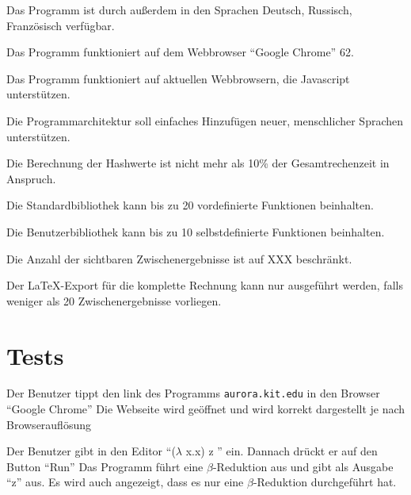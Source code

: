 \documentclass[parskip=full,11pt,twoside]{scrartcl}
\begin{document}
Das Programm ist durch außerdem in den Sprachen Deutsch, Russisch, Französisch verfügbar.

Das Programm funktioniert auf dem Webbrowser \enquote{Google Chrome} 62.

Das Programm funktioniert auf aktuellen Webbrowsern, die Javascript unterstützen.

Die Programmarchitektur soll einfaches Hinzufügen neuer, menschlicher Sprachen unterstützen.

Die Berechnung der Hashwerte ist nicht mehr als 10\% der Gesamtrechenzeit in Anspruch.

Die Standardbibliothek kann bis zu 20 vordefinierte Funktionen beinhalten.

Die Benutzerbibliothek kann bis zu 10 selbstdefinierte Funktionen beinhalten.

Die Anzahl der sichtbaren Zwischenergebnisse ist auf XXX beschränkt.

Der \LaTeX-Export für die komplette Rechnung kann nur ausgeführt werden, falls weniger als 20 Zwischenergebnisse vorliegen.



\section{Tests}


{Der Benutzer tippt den link des Programms \texttt{aurora.kit.edu} in den Browser \enquote {Google Chrome} }
{ Die Webseite wird geöffnet und wird korrekt dargestellt je nach Browserauflösung}

{ Der Benutzer gibt in den Editor \enquote {($\lambda$ x.x) z } ein. Dannach drückt er auf den Button \enquote {Run}}
{ Das Programm führt eine $\beta$-Reduktion aus und gibt als Ausgabe \enquote {z} aus. Es wird auch angezeigt, dass es nur eine $\beta$-Reduktion durchgeführt hat.}
\end{document}
